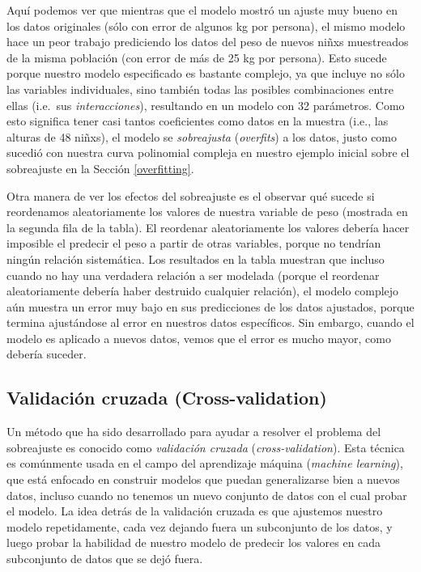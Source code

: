 \documentclass[
  12pt,
]{book}
\begin{document}
Aquí podemos ver que mientras que el modelo mostró un ajuste muy bueno en los datos originales (sólo con error de algunos kg por persona), el mismo modelo hace un peor trabajo prediciendo los datos del peso de nuevos niñxs muestreados de la misma población (con error de más de 25 kg por persona). Esto sucede porque nuestro modelo especificado es bastante complejo, ya que incluye no sólo las variables individuales, sino también todas las posibles combinaciones entre ellas (i.e.~sus \emph{interacciones}), resultando en un modelo con 32 parámetros. Como esto significa tener casi tantos coeficientes como datos en la muestra (i.e., las alturas de 48 niñxs), el modelo se \emph{sobreajusta} (\emph{overfits}) a los datos, justo como sucedió con nuestra curva polinomial compleja en nuestro ejemplo inicial sobre el sobreajuste en la Sección \ref{overfitting}.

Otra manera de ver los efectos del sobreajuste es el observar qué sucede si reordenamos aleatoriamente los valores de nuestra variable de peso (mostrada en la segunda fila de la tabla). El reordenar aleatoriamente los valores debería hacer imposible el predecir el peso a partir de otras variables, porque no tendrían ningún relación sistemática. Los resultados en la tabla muestran que incluso cuando no hay una verdadera relación a ser modelada (porque el reordenar aleatoriamente debería haber destruido cualquier relación), el modelo complejo aún muestra un error muy bajo en sus predicciones de los datos ajustados, porque termina ajustándose al error en nuestros datos específicos. Sin embargo, cuando el modelo es aplicado a nuevos datos, vemos que el error es mucho mayor, como debería suceder.

\hypertarget{cross-validation}{%
\subsection{Validación cruzada (Cross-validation)}\label{cross-validation}}

Un método que ha sido desarrollado para ayudar a resolver el problema del sobreajuste es conocido como \emph{validación cruzada} (\emph{cross-validation}). Esta técnica es comúnmente usada en el campo del aprendizaje máquina (\emph{machine learning}), que está enfocado en construir modelos que puedan generalizarse bien a nuevos datos, incluso cuando no tenemos un nuevo conjunto de datos con el cual probar el modelo. La idea detrás de la validación cruzada es que ajustemos nuestro modelo repetidamente, cada vez dejando fuera un subconjunto de los datos, y luego probar la habilidad de nuestro modelo de predecir los valores en cada subconjunto de datos que se dejó fuera.
\end{document}
